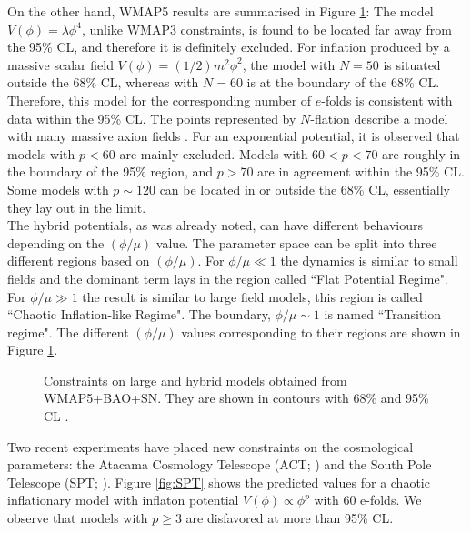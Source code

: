 \documentclass{rmaa}
\begin{document}
On the other hand, WMAP5 results are summarised in Figure \ref{fig:Komatsu2}:
The model $V(\phi)=\lambda \phi^4$, unlike WMAP3 constraints, is found to be located 
far away from the 95\% CL, and therefore it is definitely excluded. For inflation produced by a massive 
scalar field $V(\phi)=(1/2)m^2\phi^2$, the model with $N=50$ is situated outside the 
68\% CL, whereas with $N=60$ is at the boundary of the 68\% CL. 
Therefore, this model for the corresponding number of $e$-folds is consistent with data within the 95\% CL. 
The points represented by $N$-flation describe a model with many massive axion fields \citep{Liddle3}. 
For an exponential potential, it is observed that models with $p<60$ are mainly excluded.
Models with $60<p<70$ are roughly in the boundary of the 95\% region, and $p>70$ are 
in agreement within the 95\% CL. 
Some models with $p\sim 120$ can be located in or outside the 68\% CL, essentially
they lay out in the limit. 
\\

The hybrid potentials, as was already noted, can have different behaviours
depending on the $(\phi/ \mu)$ value. The parameter space can be split into three 
different regions based on $(\phi / \mu)$. For $\phi / \mu \ll 1$ the dynamics is similar to small
fields and the dominant term lays in the region called ``Flat Potential Regime". 
For $\phi / \mu \gg 1$ the result is similar to large field models, this region is called
``Chaotic Inflation-like Regime". The boundary, $\phi / \mu \sim 1$ is named 
``Transition regime". The different $(\phi / \mu)$ values corresponding to their regions
are shown in Figure \ref{fig:Komatsu2}.
  


\begin{figure}[h!]
\centerline{ \epsfxsize=190pt  }
\caption{Constraints on large and hybrid models obtained from WMAP5+BAO+SN.
They are shown in contours with 68\% and 95\% CL
 \citep{Komatsu}.}
 \label{fig:Komatsu2}
\end{figure}

Two recent experiments have placed new constraints on the cosmological parameters: the Atacama
Cosmology Telescope (ACT; \citet{ACT}) and the South Pole Telescope (SPT; \citet{SPT}).
Figure \ref{fig:SPT} shows the predicted values for a chaotic inflationary model with inflaton
potential $V(\phi)\propto\phi^p$ with 60 e-folds. We observe that models with $p\ge3$
are disfavored at more than 95\% CL.
\end{document}
